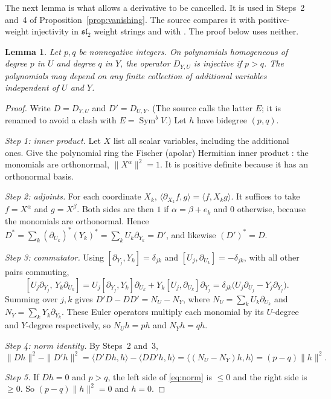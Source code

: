 \documentclass[11pt]{article}
\newtheorem{lemma}[theorem]{Lemma}
\theoremstyle{remark}
\DeclareMathOperator{\Sym}{Sym}
\newcommand{\D}[2]{D_{#1,#2}}
\begin{document}
The next lemma is what allows a derivative to be cancelled. It is used in
Steps~2 and~4 of Proposition~\ref{prop:vanishing}. The source compares it
with positive-weight injectivity in $\mathfrak{sl}_2$ weight strings
\cite[Section~11.1, Claim~11.4 and equation~(11.5)]{FultonHarris} and with
\cite[Section~5, Claim~5.1]{Ikenmeyer}. The proof below uses neither.

\begin{lemma}\label{lem:shift}
Let $p,q$ be nonnegative integers. On polynomials homogeneous of degree $p$
in $U$ and degree $q$ in $Y$, the operator $\D{Y}{U}$ is injective if
$p>q$. The polynomials may depend on any finite collection of additional
variables independent of $U$ and $Y$.
\end{lemma}

\begin{proof}
Write $D=\D{Y}{U}$ and $D'=\D{U}{Y}$. (The source calls the latter $E$; it is renamed
to avoid a clash with $E=\Sym^bV$.) Let $h$ have bidegree $(p,q)$.

\emph{Step 1: inner product.} Let $X$ list all scalar variables, including
the additional ones. Give the polynomial ring the Fischer (apolar)
Hermitian inner product
\cite[Section~2, equation~(8) and Proposition~3]{AldazRender}: the
monomials are orthonormal, $\|X^\alpha\|^2=1$.
It is positive definite because it has an orthonormal basis.

\emph{Step 2: adjoints.} For each coordinate $X_k$,
$\langle\partial_{X_k}f,g\rangle=\langle f,X_kg\rangle$. It suffices to
take $f=X^\alpha$ and $g=X^\beta$. Both sides are then $1$ if
$\alpha=\beta+e_k$ and $0$ otherwise, because
the monomials are orthonormal. Hence
$D^*=\sum_k(\partial_{U_k})^*(Y_k)^*=\sum_kU_k\partial_{Y_k}=D'$, and
likewise $(D')^*=D$.

\emph{Step 3: commutator.} Using $[\partial_{Y_j},Y_k]=\delta_{jk}$ and
$[U_j,\partial_{U_k}]=-\delta_{jk}$, with all other pairs commuting,
\[
 [U_j\partial_{Y_j},\,Y_k\partial_{U_k}]
 =U_j[\partial_{Y_j},Y_k]\partial_{U_k}+Y_k[U_j,\partial_{U_k}]\partial_{Y_j}
 =\delta_{jk}\bigl(U_j\partial_{U_j}-Y_j\partial_{Y_j}\bigr).
\]
Summing over $j,k$ gives $D'D-DD'=N_U-N_Y$, where
$N_U=\sum_kU_k\partial_{U_k}$ and $N_Y=\sum_kY_k\partial_{Y_k}$. These
Euler operators multiply each monomial by its $U$-degree and $Y$-degree
respectively, so $N_Uh=ph$ and $N_Yh=qh$.

\emph{Step 4: norm identity.} By Steps~2 and~3,
\begin{equation}\label{eq:norm}
 \|Dh\|^2-\|D'h\|^2
 =\langle D'Dh,h\rangle-\langle DD'h,h\rangle
 =\langle(N_U-N_Y)h,h\rangle=(p-q)\|h\|^2.
\end{equation}

\emph{Step 5.} If $Dh=0$ and $p>q$, the left side of \eqref{eq:norm} is
$\le0$ and the right side is $\ge0$. So $(p-q)\|h\|^2=0$ and $h=0$.
\end{proof}
\end{document}
